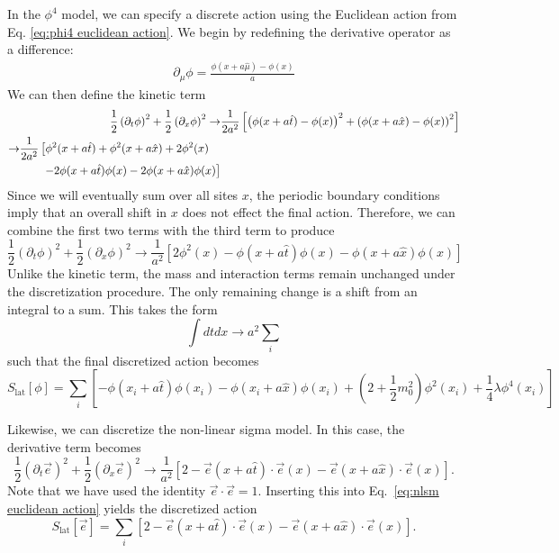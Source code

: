 \documentclass[12pt]{report}
\newcommand{\e}{\vec e}
\newcommand{\half}{\frac{1}{2}}
\begin{document}
In the $\phi^4$ model, we can specify a discrete action using the Euclidean action from Eq. \ref{eq:phi4 euclidean action}. We begin by redefining the derivative operator as a difference:
\begin{align}
    \partial_\mu \phi = \frac{\phi\left(x + a \hat{\mu}\right) - \phi(x)}{a}
\end{align}
We can then define the kinetic term
\begin{align}
    \half \left(\partial_t\phi\right)^2 + \half \left(\partial_x\phi\right)^2 \rightarrow& \frac{1}{2a^2}\left[ \left(\phi(x+a \hat{t}) -\phi(x)\right)^2 + \left(\phi(x+a \hat{x}) -\phi(x)\right)^2\right] \\
    \begin{split} \rightarrow& \frac{1}{2a^2}\left[ \phi^2(x+a\hat{t}) + \phi^2(x+a\hat{x}) + 2\phi^2(x)\right.\\ &\qquad \left.- 2\phi(x+a\hat{t})\phi(x) - 2\phi(x+a\hat{x})\phi(x) \right]\hfilneg\end{split}
\end{align}
Since we will eventually sum over all sites $x$, the periodic boundary conditions imply that an overall shift in $x$ does not effect the final action. Therefore, we can combine the first two terms with the third term to produce 
\begin{equation}
    \half \left(\partial_t\phi\right)^2 + \half \left(\partial_x\phi\right)^2 \rightarrow \frac{1}{a^2}\left[ 2\phi^2(x) - \phi(x+a\hat{t})\phi(x) - \phi(x+a\hat{x})\phi(x) \right]
\end{equation}
Unlike the kinetic term, the mass and interaction terms remain unchanged under the discretization procedure. The only remaining change is a shift from an integral to a sum. This takes the form
\begin{equation}
    \int dtdx \rightarrow a^2 \sum_i
\end{equation}
such that the final discretized action becomes
\begin{equation}
    \label{eq:phi4 discretized action}
    S_{\mathrm{lat}}[\phi] = \sum_i \left[-\phi(x_i + a\hat{t})\phi(x_i) - \phi(x_i + a\hat{x})\phi(x_i) + \left(2+\half m_0^2\right)\phi^2(x_i) + \frac{1}{4}\lambda \phi^4(x_i)\right]
\end{equation}

Likewise, we can discretize the non-linear sigma model. In this case, the derivative term becomes 
\begin{equation}
    \half \left(\partial_t\e\right)^2 + \half \left(\partial_x\e\right)^2 \rightarrow \frac{1}{a^2}\left[ 2 - \e(x+a\hat{t})\cdot\e(x) - \e(x+a\hat{x})\cdot\e(x) \right].
\end{equation}
Note that we have used the identity $\e\cdot\e = 1$. Inserting this into Eq.~\ref{eq:nlsm euclidean action} yields the discretized action
\begin{equation}
    \label{eq:nlsm discretized action}
    S_\mathrm{lat}[\e] = \sum_i \left[ 2 - \e(x+a\hat{t})\cdot\e(x) - \e(x+a\hat{x})\cdot\e(x) \right].
\end{equation}
\end{document}
